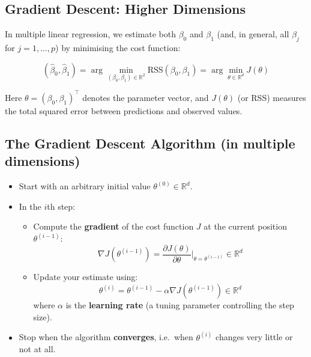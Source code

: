 \documentclass[
  letterpaper,
  DIV=11,
  numbers=noendperiod]{scrartcl}
\providecommand{\tightlist}{%
  \setlength{\itemsep}{0pt}\setlength{\parskip}{0pt}}\usepackage{longtable,booktabs,array}
\begin{document}
\subsection{Gradient Descent: Higher
Dimensions}\label{gradient-descent-higher-dimensions}

In multiple linear regression, we estimate both \(\beta_0\) and
\(\beta_1\) (and, in general, all \(\beta_j\) for \(j = 1, \dots, p\))
by minimising the cost function:

\[(\hat{\beta}_0, \hat{\beta}_1) = \arg\min_{(\beta_0, \beta_1) \in \mathbb{R}^2} \text{RSS}(\beta_0, \beta_1) = \arg\min_{\theta \in \mathbb{R}^d} J(\theta)\]

Here \(\theta = (\beta_0, \beta_1)^\top\) denotes the parameter vector,
and \(J(\theta)\) (or RSS) measures the total squared error between
predictions and observed values.

\subsection{The Gradient Descent Algorithm (in multiple
dimensions)}\label{the-gradient-descent-algorithm-in-multiple-dimensions}

\begin{itemize}
\tightlist
\item
  Start with an arbitrary initial value
  \(\theta^{(0)} \in \mathbb{R}^d\).
\item
  In the \(i\)th step:

  \begin{itemize}
  \tightlist
  \item
    Compute the \textbf{gradient} of the cost function \(J\) at the
    current position \(\theta^{(i-1)}\):\\
    \[\nabla J(\theta^{(i-1)}) = \frac{\partial J(\theta)}{\partial \theta} \Big|_{\theta = \theta^{(i-1)}} \in \mathbb{R}^d\]
  \item
    Update your estimate using:\\
    \[\theta^{(i)} = \theta^{(i-1)} - \alpha \nabla J(\theta^{(i-1)}) \in \mathbb{R}^d\]
    where \(\alpha\) is the \textbf{learning rate} (a tuning parameter
    controlling the step size).
  \end{itemize}
\item
  Stop when the algorithm \textbf{converges}, i.e.~when \(\theta^{(i)}\)
  changes very little or not at all.
\end{itemize}
\end{document}
